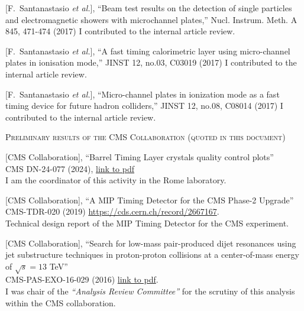 \documentclass[10pt, a4paper]{article}
\begin{document}
\begin{thebibliography}{599}
[F.~Santanastasio {\it et al.}],
``Beam test results on the detection of single particles and electromagnetic showers with microchannel plates,''
Nucl. Instrum. Meth. A 845, 471-474 (2017)
I contributed to the internal article review.

[F.~Santanastasio {\it et al.}],
``A fast timing calorimetric layer using micro-channel plates in ionisation mode,''
JINST 12, no.03, C03019 (2017)
I contributed to the internal article review.

[F.~Santanastasio {\it et al.}],
``Micro-channel plates in ionization mode as a fast timing device for future hadron colliders,''
JINST 12, no.08, C08014 (2017)
I contributed to the internal article review.


\vspace{0.1cm} \begin{center} \textsc{Preliminary results of the CMS
    Collaboration (quoted in this document)} \end{center} \vspace{0.05cm}

  [CMS Collaboration],  ``Barrel Timing Layer crystals quality control plots''\\
  CMS DN-24-077 (2024), \href{https://cds.cern.ch/record/2909331}{link to pdf}
  \\ I am the coordinator of this activity in the Rome laboratory.

  [CMS Collaboration], 
  ``A MIP Timing Detector for the CMS Phase-2 Upgrade''\\
  CMS-TDR-020 (2019)
  \href{https://cds.cern.ch/record/2667167}{https://cds.cern.ch/record/2667167}.
  \\ Technical design report of the MIP Timing Detector for the CMS experiment.

  [CMS Collaboration], 
  ``Search for low-mass
  pair-produced dijet resonances using jet substructure techniques in
  proton-proton collisions at a center-of-mass energy of $\sqrt{s}=13$
  TeV''\\
  CMS-PAS-EXO-16-029 (2016)
  \href{http://cds.cern.ch/record/2231062/files/EXO-16-029-pas.pdf}{link
    to pdf}.
  \\ I was chair of the {\it``Analysis Review Committee''} for the scrutiny of this analysis within the CMS collaboration. 


\end{thebibliography}
\end{document}
